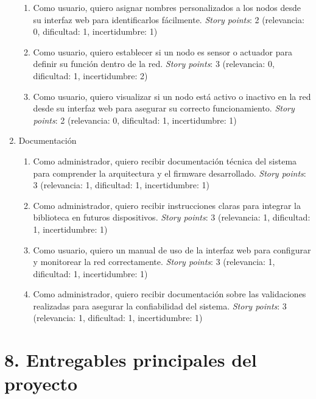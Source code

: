 \documentclass[
11pt, %
]{charter}
\begin{document}
\begin{enumerate}
\begin{enumerate}
	\item Como usuario, quiero asignar nombres personalizados a los nodos desde su interfaz web para identificarlos fácilmente. \textit{Story points}: 2 (relevancia: 0, dificultad: 1, incertidumbre: 1)

	\item Como usuario, quiero establecer si un nodo es sensor o actuador para definir su función dentro de la red. \textit{Story points}: 3 (relevancia: 0, dificultad: 1, incertidumbre: 2)

	\item Como usuario, quiero visualizar si un nodo está activo o inactivo en la red desde su interfaz web para asegurar su correcto funcionamiento. \textit{Story points}: 2 (relevancia: 0, dificultad: 1, incertidumbre: 1)

\end{enumerate}

\item Documentación 
\begin{enumerate}
	\item Como administrador, quiero recibir documentación técnica del sistema para comprender la arquitectura y el firmware desarrollado. \textit{Story points}: 3 (relevancia: 1, dificultad: 1, incertidumbre: 1)

	\item Como administrador, quiero recibir instrucciones claras para integrar la biblioteca en futuros dispositivos. \textit{Story points}: 3 (relevancia: 1, dificultad: 1, incertidumbre: 1)

	\item Como usuario, quiero un manual de uso de la interfaz web para configurar y monitorear la red correctamente. \textit{Story points}: 3 (relevancia: 1, dificultad: 1, incertidumbre: 1)

	\item Como administrador, quiero recibir documentación sobre las validaciones realizadas para asegurar la confiabilidad del sistema. \textit{Story points}: 3 (relevancia: 1, dificultad: 1, incertidumbre: 1)

\end{enumerate}

\end{enumerate}


\section{8. Entregables principales del proyecto}
\label{sec:entregables}
\end{document}
